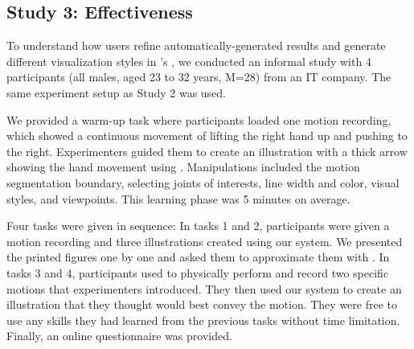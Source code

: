 
\subsection{Study 3: \phaseII{} Effectiveness}

To understand how users refine automatically-generated results and generate different visualization styles in \systemname{}'s \phaseII{}, we conducted an informal study with 4 participants (all males, aged 23 to 32 years, M=28) from an IT company.
%
The same experiment setup as Study 2 was used.


We provided a warm-up task where participants loaded one motion recording, which showed a continuous movement of lifting the right hand up and pushing to the right. Experimenters guided them to create an illustration with a thick arrow showing the hand movement using \systemname{}. Manipulations included the motion segmentation boundary, selecting joints of interests, line width and color, visual styles, and viewpoints. This learning phase was 5 minutes on average.

Four tasks were given in sequence:
%
In tasks 1 and 2, participants were given a motion recording and three illustrations created using our system. We presented the printed figures one by one and asked them to approximate them with \systemname{}.
%
%
In tasks 3 and 4, participants used \systemname{} to physically perform and record two specific motions that experimenters introduced.
They then used our system to create an illustration that they thought would best convey the motion. They were free to use any skills they had learned from the previous tasks without time limitation.
%
Finally, an online questionnaire was provided.


